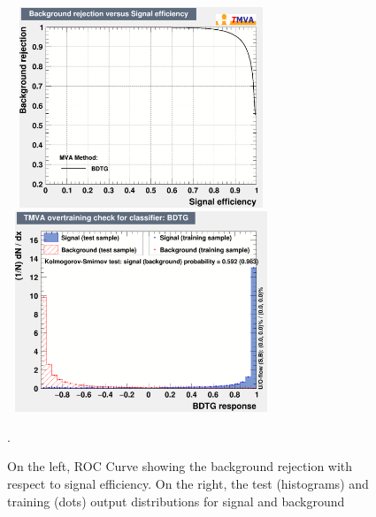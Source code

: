 \documentclass{cernatlasnote}
\begin{document}
\begin{appendices}
\begin{figure}[ht]
\centering
\includegraphics[height=6cm, width=8cm, trim= 0cm 0cm 0cm 0cm,clip]{images/TRKBDT/BDTDaniel_ROC.png}\includegraphics[height=6cm, width=8cm, trim= 0cm 0cm 0cm 0cm,clip]{images/TRKBDT/BDTDaniel_SB.png}
\caption{\label{fig:TRKTraining} On the left, ROC Curve showing the background rejection with respect to signal efficiency. On the right, the test (histograms) and training (dots) output distributions for signal and background}.
\end{figure} 


\end{appendices}
\end{document}
